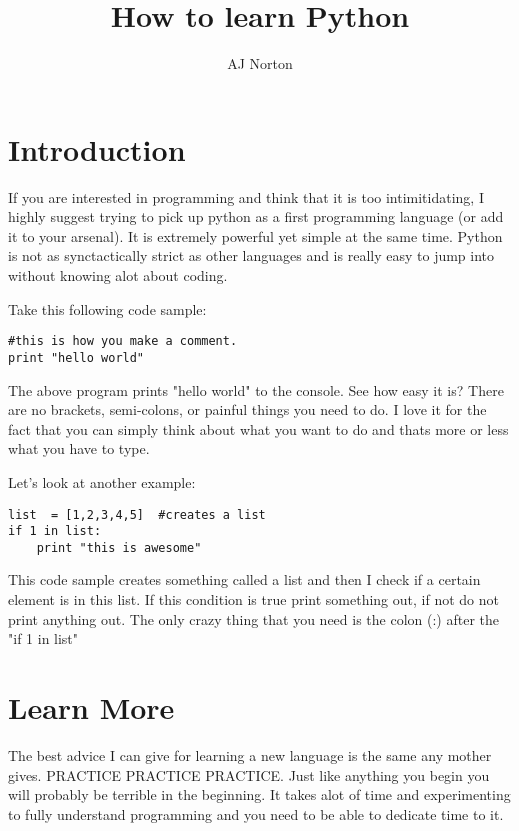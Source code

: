 \documentclass{article}
\begin{document}
\lstset{language=Python}          %

\title{How to learn Python}
\author{AJ Norton}

\maketitle



\section{Introduction}
If you are interested in programming and think that it is too intimitidating, I highly suggest trying to pick up python as a first 
programming language (or add it to your arsenal).  It is extremely powerful yet simple at the same time.  Python is not as 
synctactically strict as other languages and is really easy to jump into without knowing alot about coding. 

 Take this following code sample:

\begin{lstlisting}[frame=single] 
#this is how you make a comment.
print "hello world"
\end{lstlisting}

The above program prints "hello world" to the console.  See how easy it is? There are no brackets, semi-colons, or painful things 
you need to do.  I love it for the fact that you can simply think about what you want to do and thats more or less what you have 
to type.

Let's look at another example:

\begin{lstlisting}[frame=single] 
list  = [1,2,3,4,5]  #creates a list 
if 1 in list:
	print "this is awesome"
\end{lstlisting}

This code sample creates something called a list and then I check if a certain element is in this list.  If this condition is true print something out, if not do not print anything out.  The only crazy thing that you need is the colon (:) after the "if 1 in list"


\section{Learn More}
The best advice I can give for learning a new language is the same any mother gives.  \large{PRACTICE PRACTICE PRACTICE}.  Just like
anything you begin you will probably be terrible in the beginning.  It takes alot of time and experimenting to fully understand programming and you need to be able to dedicate time to it.
\end{document}
